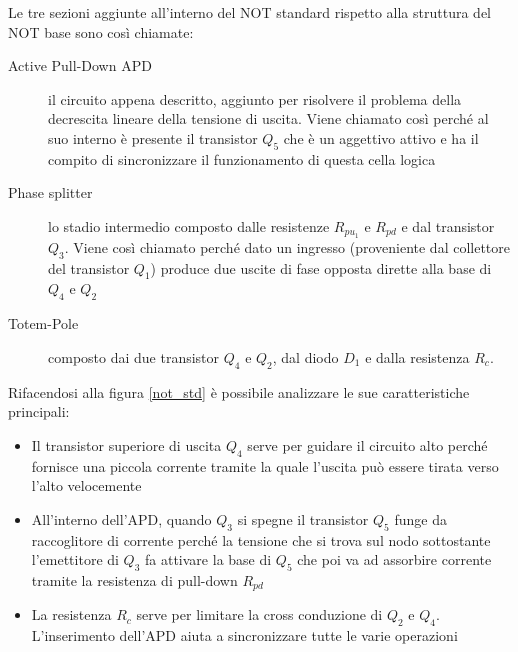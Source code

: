 \documentclass[12pt, a4paper]{report}
\begin{document}
Le tre sezioni aggiunte all'interno del NOT standard rispetto alla struttura del NOT base sono così chiamate:
\begin{description}
    \item[Active Pull-Down APD] il circuito appena descritto, aggiunto per risolvere il problema della decrescita lineare della tensione di uscita. Viene chiamato così perché al suo interno è presente il transistor $Q_5$ che è un aggettivo attivo e ha il compito di sincronizzare il funzionamento di questa cella logica
    \item[Phase splitter] lo stadio intermedio composto dalle resistenze $R_{pu_1}$ e $R_{pd}$ e dal transistor $Q_3$. Viene così chiamato perché dato un ingresso (proveniente dal collettore del transistor $Q_1$) produce due uscite di fase opposta dirette alla base di $Q_4$ e $Q_2$
    \item[Totem-Pole] composto dai due transistor $Q_4$ e $Q_2$, dal diodo $D_1$ e dalla resistenza $R_c$.
\end{description}
Rifacendosi alla figura \ref{not_std} è possibile analizzare le sue caratteristiche principali:
\begin{itemize}
    \item Il transistor superiore di uscita $Q_4$ serve per guidare il circuito alto perché fornisce una piccola corrente tramite la quale l'uscita può essere tirata verso l'alto velocemente
    \item All'interno dell'APD, quando $Q_3$ si spegne il transistor $Q_5$ funge da raccoglitore di corrente perché la tensione che si trova sul nodo sottostante l'emettitore di $Q_3$ fa attivare la base di $Q_5$ che poi va ad assorbire corrente tramite la resistenza di pull-down $R_{pd}$
    \item La resistenza $R_c$ serve per limitare la cross conduzione di $Q_2$ e $Q_4$. L'inserimento dell'APD aiuta a sincronizzare tutte le varie operazioni
\end{itemize}
\end{document}

